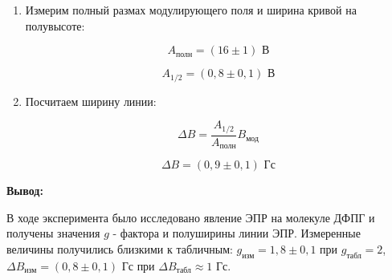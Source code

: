 \documentclass[a4paper, 12pt]{article}%
\begin{document}
\begin{enumerate}
\begin{enumerate}
		\item Измерим полный размах модулирующего поля и ширина кривой на полувысоте:
		
		\[A_\text{полн} = (16 \pm 1) \text{ В}\]
		
		\[A_{1/2} = (0,8 \pm 0,1) \text{ В}\]
			
		\item Посчитаем ширину линии:

		\[\Delta B = \frac{A_{1/2}}{A_{\text{полн}}}B_\text{мод}\]		
		
		\[\Delta B = (0,9 \pm 0,1) \text{ Гс}\]

		\end{enumerate}	

\end{enumerate}
		
\textbf{Вывод:}\\\par

	В ходе эксперимента было исследовано явление ЭПР на молекуле ДФПГ и получены значения $g$ - фактора и полуширины линии ЭПР.  Измеренные величины получились близкими к табличным: $g_{\text{изм}} = 1, 8 \pm 0,1$ при $g_{\text{табл}} = 2$,  $\Delta B_{\text{изм}} = (0,8 \pm 0,1)\text{ Гс}$ при $\Delta B_{\text{табл}} \approx 1 \text{ Гс}$.
		
\end{document}
